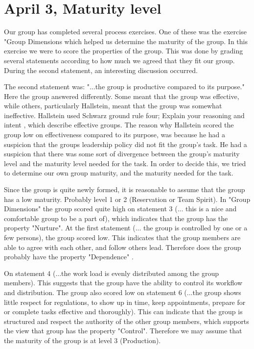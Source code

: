 \section{April 3, Maturity level}
Our group has completed several process exercises. One of these was the exercise "Group Dimensions which helped us determine the maturity of the group. In this exercise we were to score the properties of the group. This was done by grading several statements according to how much we agreed that they fit our group. During the second statement, an interesting discussion occurred. 

The second statement was: "...the group is productive compared to its purpose." Here the group answered differently. Some meant that the group was effective, while others, particularly Hallstein, meant that the group was somewhat ineffective. Hallstein used Schwarz ground rule four; Explain your reasoning and intent \cite{EffectiveGroups}, which describe effective groups. The reason why Hallstein scored the group low on effectiveness compared to its purpose, was because he had a suspicion that the groups leadership policy did not fit the group's task. He had a suspicion that there was some sort of divergence between the group’s maturity level and the maturity level needed for the task. In order to decide this, we tried to determine our own group maturity, and the maturity needed for the task. 

Since the group is quite newly formed, it is reasonable to assume that the group has a low maturity. Probably level 1 or 2 (Reservation or Team Spirit). In "Group Dimensions" the group scored quite high on statement 3 (... this is a nice and comfortable group to be a part of), which indicates that the group has the property "Nurture". At the first statement (... the group is controlled by one or a few persons), the group scored low. This indicates that the group members are able to agree with each other, and follow others lead. Therefore does the group probably have the property "Dependence" \cite{Maturity}.

On statement 4 (...the work load is evenly distributed among the group members). This suggests that the group have the ability to control its workflow and distribution. The group also scored low on statement 6 (...the group shows little respect for regulations, to show up in time, keep appointments, prepare for or complete tasks effective and thoroughly). This can indicate that the group is structured and respect the authority of the other group members, which supports the view that group has the property "Control". Therefore we may assume that the maturity of the group is at level 3 (Production)\cite{Maturity}.

